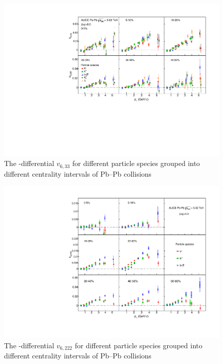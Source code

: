 \documentclass[ALICE,manyauthors]{cernphprep}
\providecommand{\DIFaddbeginFL}{} %
\providecommand{\DIFaddendFL}{} %
\providecommand{\DIFdelbeginFL}{} %
\providecommand{\DIFdelendFL}{} %
\begin{document}
\begin{figure}[!htb]
\begin{center}
\DIFdelbeginFL %
\DIFdelendFL %
\DIFaddbeginFL \includegraphics[scale=0.82]{figures/results/All_v633_gap00_PID2_3by2.pdf}

\DIFaddendFL \end{center}
\caption{The \pT-differential $v_{6,33}$ for different particle species grouped into different centrality intervals of Pb--Pb collisions \sNN}
\label{v633_particleDependence}
\end{figure}

\begin{figure}[!htb]
\begin{center}
\DIFdelbeginFL %
\DIFdelendFL %
\DIFaddbeginFL \includegraphics[scale=0.82]{figures/results/All_v6222_gap00_PID2_3by3.pdf}

\DIFaddendFL \end{center}
\caption{The \pT-differential $v_{6,222}$ for different particle species grouped into different centrality intervals of Pb--Pb collisions \sNN}
\label{v6222_particleDependence}
\end{figure}
\end{document}
